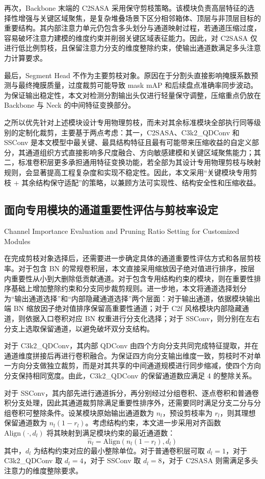 再次，Backbone 末端的 C2SASA 采用保守剪枝策略。该模块负责高层特征的选择性增强与关键区域聚焦，是复杂堆叠场景下区分相邻箱体、顶层与非顶层目标的重要结构。其内部注意力单元仍包含多头划分与通道映射过程，若通道压缩过度，容易破坏注意力建模的维度约束并削弱关键区域表征能力。因此，对 C2SASA 仅进行低比例剪枝，且保留注意力分支的维度整除约束，使输出通道数满足多头注意力计算要求。

最后，Segment Head 不作为主要剪枝对象。原因在于分割头直接影响掩膜系数预测与最终掩膜质量，过度裁剪可能导致 mask mAP 和后续盘点准确率同步波动。为保证输出稳定性，本文对检测分割输出头仅进行轻量保守调整，压缩重点仍放在 Backbone 与 Neck 的中间特征变换部分。

之所以优先针对上述模块设计专用物理剪枝，而未对其余标准模块全部执行同等级别的定制化裁剪，主要基于两点考虑：其一，C2SASA、C3k2\_QDConv 和 SSConv 是本文模型中最关键、最具结构特征且最有可能带来压缩收益的自定义部分，其通道组织方式直接影响多尺度融合、方向敏感建模和关键区域聚焦能力；其二，标准卷积层更多承担通用特征变换功能，若全部为其设计专用物理剪枝与映射规则，会显著提高工程复杂度和实现不稳定性。因此，本文采用“关键模块专用剪枝 + 其余结构保守适配”的策略，以兼顾方法可实现性、结构安全性和压缩收益。

\subsection{面向专用模块的通道重要性评估与剪枝率设定}{Channel Importance Evaluation and Pruning Ratio Setting for Customized Modules}

在完成剪枝对象选择后，还需要进一步确定具体的通道重要性评估方式和各层剪枝率。对于包含 BN 的常规卷积层，本文直接采用缩放因子绝对值进行排序，按层内重要性从小到大删除低贡献通道。对于包含专用结构约束的模块，则在重要性排序基础上增加整除约束和分支同步裁剪规则。进一步地，本文将通道选择划分为“输出通道选择”和“内部隐藏通道选择”两个层面：对于输出通道，依据模块输出端 BN 缩放因子绝对值排序保留高重要性通道；对于 C2f 风格模块内部隐藏通道，则依据入口卷积对应 BN 权重进行分支化选择；对于 SSConv，则分别在左右分支上选取保留通道，以避免破坏双分支结构。

对于 C3k2\_QDConv，其内部 QDConv 由四个方向分支共同完成特征提取，并在通道维度拼接后再进行卷积融合。为保证四方向分支输出维度一致，剪枝时不对单一方向分支做独立裁剪，而是对其共享的中间通道规模进行同步缩减，使四个方向分支保持相同宽度。由此，C3k2\_QDConv 的保留通道数应满足 4 的整除关系。

对于 SSConv，其内部先进行通道拆分，再分别经过分组卷积、逐点卷积和普通卷积分支处理，因此其通道裁剪除满足重要性排序外，还需要同时满足分支二分与分组卷积可整除条件。设某模块原始输出通道数为 $n_l$，预设剪枝率为 $r_l$，则其理想保留通道数为 $n_l(1-r_l)$。考虑结构约束，本文进一步采用对齐函数 $\mathrm{Align}(\cdot,d_l)$ 将其映射到满足模块约束的最近通道数：
\begin{equation}
\hat{n}_l = \mathrm{Align}(n_l(1-r_l), d_l)
\end{equation}
其中，$d_l$ 为结构约束对应的最小整除单位。对于普通卷积层可取 $d_l=1$，对于 C3k2\_QDConv 取 $d_l=4$，对于 SSConv 取 $d_l=8$，对于 C2SASA 则需满足多头注意力的维度整除要求。

